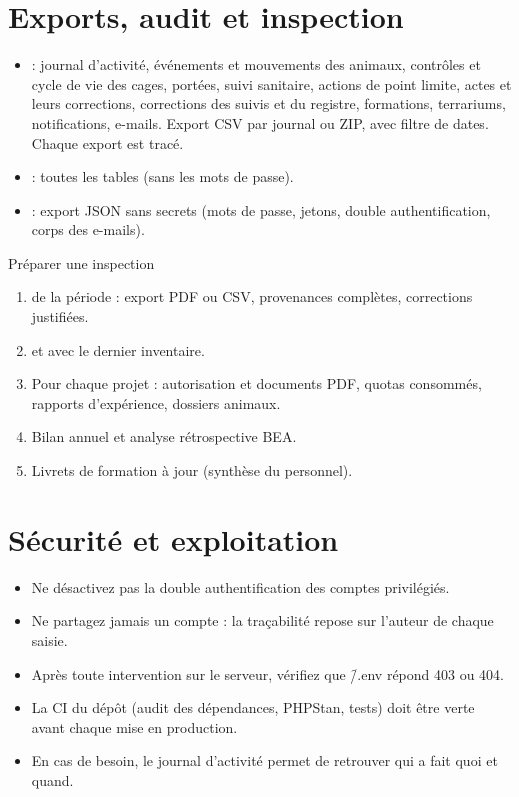 \documentclass[11pt,a4paper]{article}
\begin{document}
\section{Exports, audit et inspection}
\begin{itemize}
  \item {} : journal d'activité,
    événements et mouvements des animaux, contrôles et cycle de vie des
    cages, portées, suivi sanitaire, actions de point limite, actes et leurs
    corrections, corrections des suivis et du registre, formations,
    terrariums, notifications, e-mails. Export CSV par journal ou ZIP, avec
    filtre de dates. Chaque export est tracé.
  \item {} : toutes les tables (sans les
    mots de passe).
  \item {} : export JSON sans secrets
    (mots de passe, jetons, double authentification, corps des e-mails).
\end{itemize}

\begin{procedure}{Préparer une inspection}
\begin{enumerate}
  \item {} de la période : export PDF ou
    CSV, provenances complètes, corrections justifiées.
  \item {} et  avec le
    dernier inventaire.
  \item Pour chaque projet : autorisation et documents PDF, quotas
    consommés, rapports d'expérience, dossiers animaux.
  \item Bilan annuel et analyse rétrospective BEA.
  \item Livrets de formation à jour (synthèse du personnel).
\end{enumerate}
\end{procedure}

\section{Sécurité et exploitation}
\begin{itemize}
  \item Ne désactivez pas la double authentification des comptes
    privilégiés.
  \item Ne partagez jamais un compte : la traçabilité repose sur l'auteur de
    chaque saisie.
  \item Après toute intervention sur le serveur, vérifiez que \f{/.env}
    répond 403 ou 404.
  \item La CI du dépôt (audit des dépendances, PHPStan, tests) doit être
    verte avant chaque mise en production.
  \item En cas de besoin, le journal d'activité permet de retrouver qui a
    fait quoi et quand.
\end{itemize}
\end{document}
